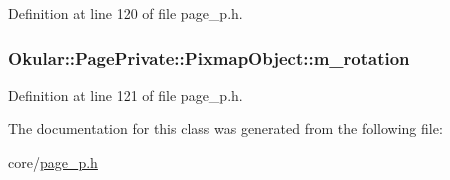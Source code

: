Definition at line 120 of file page\+\_\+p.\+h.

\hypertarget{classOkular_1_1PagePrivate_1_1PixmapObject_a3370c3f8f2ce0c7e4ace30a7b674a0dd}{
\subsubsection[{m\+\_\+rotation}]{ Okular\+::\+Page\+Private\+::\+Pixmap\+Object\+::m\+\_\+rotation}}\label{classOkular_1_1PagePrivate_1_1PixmapObject_a3370c3f8f2ce0c7e4ace30a7b674a0dd}


Definition at line 121 of file page\+\_\+p.\+h.



The documentation for this class was generated from the following file\+:\begin{DoxyCompactItemize}
\item 
core/\hyperlink{page__p_8h}{page\+\_\+p.\+h}\end{DoxyCompactItemize}
